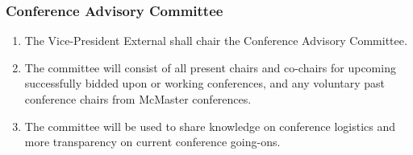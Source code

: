 \subsubsection{Conference Advisory Committee}
\label{conference-advisory-committee}
\begin{enumerate}
 \item
  The Vice-President External shall chair the Conference Advisory Committee.
 \item
  The committee will consist of all present chairs and co-chairs for upcoming successfully bidded upon or working conferences, and any voluntary past conference chairs from McMaster conferences.
 \item
  The committee will be used to share knowledge on conference logistics and more transparency on current conference going-ons.
\end{enumerate}

